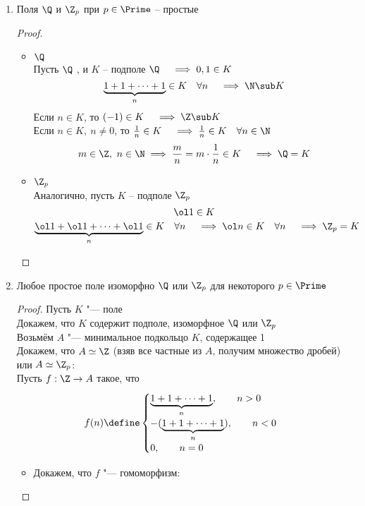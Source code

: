 \begin{theorem}
	\hfill
	\begin{enumerate}
		\item Поля $ \Q $ и $ \Z_p $ при $ p \in \Prime $ -- простые
		\begin{proof}
			\hfill
			\begin{itemize}
				\item $ \Q $ \\
				Пусть $ \Q $ , и $ K $ -- подполе $ \Q \quad \implies 0, 1 \in K $
				$$ \underbrace{1 + 1 + \dots + 1}_n \in K \quad \forall n \quad \implies \N \sub K $$
				Если $ n \in K $, то $ (-1) \in K \quad \implies \Z \sub K $ \\
				Если $ n \in K, ~ n \ne 0 $, то $ \frac1n \in K \quad \implies \frac1n \in K \quad \forall n \in \N $
				$$ m \in \Z, ~ n \in \N \implies \frac mn = m \cdot \frac1n \in K \quad \implies \Q = K $$
				\item $ \Z_p $ \\
				Аналогично, пусть $ K $ -- подполе $ \Z_p $
				$$ \ol1 \in K $$
				$$ \underbrace{\ol1 + \ol1 + \dots + \ol1}_n \in K \quad \forall n \quad \implies \ol n \in K \quad \forall n \quad \implies \Z_p = K $$
			\end{itemize}
		\end{proof}
		\item Любое простое поле изоморфно $ \Q $ или $ \Z_p $ для некоторого $ p \in \Prime $
		\begin{proof}
			Пусть $ K $ "--- поле \\
			Докажем, что $ K $ содержит подполе, изоморфное $ \Q $ или $ \Z_p $ \\
			Возьмём $ A $ "--- минимальное подкольцо $ K $, содержащее 1 \\
			Докажем, что $ A \simeq \Z $ (взяв все частные из $ A $, получим множество дробей) или $ A \simeq \Z_p $: \\
			Пусть $ f : \Z \to A $ такое, что
			$$ f(n) \define
			\begin{cases}
				\underbrace{1 + 1 + \dots + 1}_n, \qquad n > 0 \\
				-(\underbrace{1 + 1 + \dots + 1}_n), \qquad n < 0 \\
				0, \qquad n = 0
			\end{cases} $$
			\begin{itemize}
				\item Докажем, что $ f $ "--- гомоморфизм:
				\begin{itemize}

\end{itemize}
\end{itemize}
\end{proof}
\end{enumerate}
\end{theorem}
